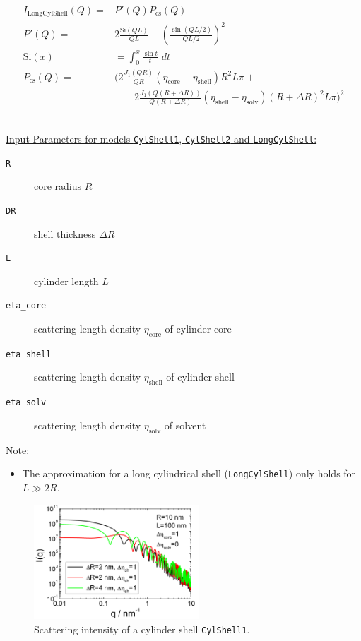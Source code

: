 \begin{align}
  I_\text{LongCylShell}(Q) = & P'(Q) P_\text{cs}(Q) \\
  P'(Q)  = & 2 \frac{\text{Si}(Q L)}{QL} - \left(\frac{\sin(QL/2)}{QL/2}\right)^2 \\
  \text{Si}(x) & = \int_0^x\!\frac{\sin t}{t}\,\,dt \\
  P_\text{cs}(Q)  =  & \biggl(
            2\frac{J_1(QR)}{QR}
            \left(\eta_\text{core}-\eta_\text{shell}\right)R^2L\pi + \\
         & \qquad
            2\frac{J_1(Q(R+\Delta R))}{Q(R+\Delta R)}
            \left(\eta_\text{shell}-\eta_\text{solv}\right)(R+\Delta R)^2L\pi
      \biggr)^2  \nonumber
\end{align}


\vspace{5mm}

\hspace{1pt}\\
\underline{Input Parameters for models \texttt{CylShell1}, \texttt{CylShell2} and \texttt{LongCylShell}:}\\
\begin{description}
\item[\texttt{R}] core radius $R$
\item[\texttt{DR}] shell thickness $\Delta R$
\item[\texttt{L}] cylinder length $L$
\item[\texttt{eta\_core}] scattering length density $\eta_\text{core}$ of cylinder core
\item[\texttt{eta\_shell}] scattering length density $\eta_\text{shell}$ of cylinder shell
\item[\texttt{eta\_solv}] scattering length density $\eta_\text{solv}$ of solvent
\end{description}

\underline{Note:}
\begin{itemize}
\item The approximation for a long cylindrical shell (\texttt{LongCylShell}) only holds for $L \gg 2R$.
\end{itemize}

\begin{figure}[htb]
\begin{center}
\includegraphics[width=0.55\textwidth,height=0.4\textwidth]{../images/form_factor/cylindrical_obj/CylShell1IQ.png}
\end{center}
\caption{Scattering intensity of a cylinder shell \texttt{CylShell1}.}
\label{fig:CylShell1}
\end{figure}

